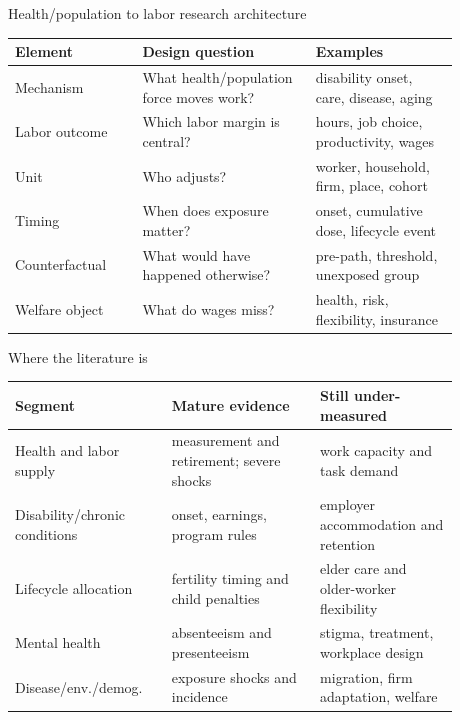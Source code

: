 \documentclass[aspectratio=169,11pt]{beamer}
\begin{document}
\begin{frame}{Health/population to labor research architecture}
\small
\begin{tabular}{p{0.25\linewidth} p{0.34\linewidth} p{0.29\linewidth}}
\toprule
Element & Design question & Examples \\
\midrule
Mechanism & What health/population force moves work? & disability onset, care, disease, aging \\
Labor outcome & Which labor margin is central? & hours, job choice, productivity, wages \\
Unit & Who adjusts? & worker, household, firm, place, cohort \\
Timing & When does exposure matter? & onset, cumulative dose, lifecycle event \\
Counterfactual & What would have happened otherwise? & pre-path, threshold, unexposed group \\
Welfare object & What do wages miss? & health, risk, flexibility, insurance \\
\bottomrule
\end{tabular}
\end{frame}

\begin{frame}{Where the literature is}
\small
\begin{tabular}{p{0.30\linewidth} p{0.30\linewidth} p{0.28\linewidth}}
\toprule
Segment & Mature evidence & Still under-measured \\
\midrule
Health and labor supply & measurement and retirement; severe shocks & work capacity and task demand \\
Disability/chronic conditions & onset, earnings, program rules & employer accommodation and retention \\
Lifecycle allocation & fertility timing and child penalties & elder care and older-worker flexibility \\
Mental health & absenteeism and presenteeism & stigma, treatment, workplace design \\
Disease/env./demog. & exposure shocks and incidence & migration, firm adaptation, welfare \\
\bottomrule
\end{tabular}
\end{frame}
\end{document}
